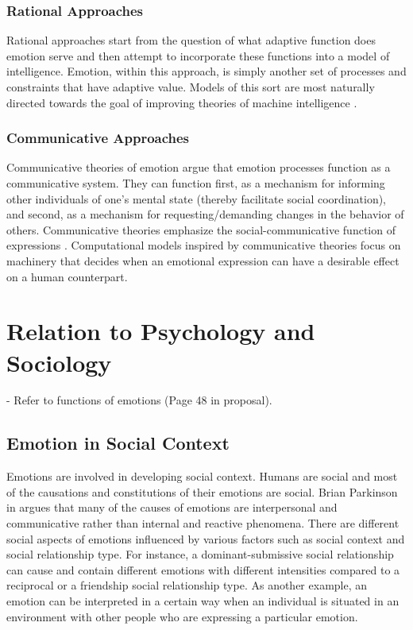 \documentclass[11pt]{article}
\begin{document}
\subsubsection{Rational Approaches}

Rational approaches start from the question of what adaptive function does
emotion serve and then attempt to incorporate these functions into a model of
intelligence. Emotion, within this approach, is simply another set of processes
and constraints that have adaptive value. Models of this sort are most naturally
directed towards the goal of improving theories of machine intelligence
\cite{anderson:newell-cognition} \cite{scheutz:affect-agent}
\cite{simon:motivation-emotion-cognition}.

\subsubsection{Communicative Approaches}

Communicative theories of emotion argue that emotion processes function as a
communicative system. They can function first, as a mechanism for informing
other individuals of one’s mental state (thereby facilitate social
coordination), and second, as a mechanism for requesting/demanding changes in
the behavior of others. Communicative theories emphasize the
social-communicative function of expressions \cite{gratch:emotion-intention}.
Computational models inspired by communicative theories focus on machinery that
decides when an emotional expression can have a desirable effect on a human
counterpart.

\section{Relation to Psychology and Sociology}

- Refer to functions of emotions (Page 48 in proposal).

\subsection{Emotion in Social Context}

Emotions are involved in developing social context. Humans are social and most
of the causations and constitutions of their emotions are social. Brian
Parkinson in \cite{parkinson:emotions-social} argues that many of the causes of
emotions are interpersonal and communicative rather than internal and reactive
phenomena. There are different social aspects of emotions influenced by various
factors such as social context and social relationship type. For instance, a
dominant-submissive social relationship can cause and contain different emotions
with different intensities compared to a reciprocal or a friendship social
relationship type. As another example, an emotion can be interpreted in a
certain way when an individual is situated in an environment with other people
who are expressing a particular emotion.
\end{document}
